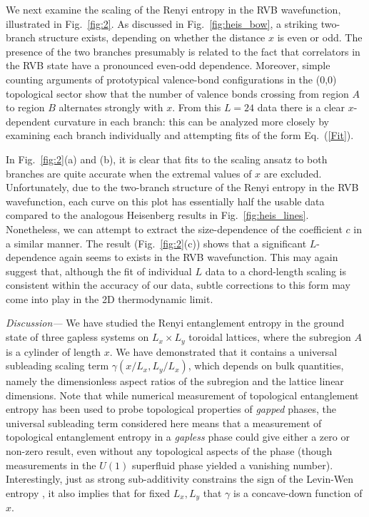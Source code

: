 \documentclass[prl,aps,twocolumn,floatfix,amsmath,amssymb,superscriptaddress,tightenlines]{revtex4}
\begin{document}
We next examine the scaling of the Renyi entropy in the RVB wavefunction, illustrated in Fig.~{\ref{fig:2}}.  
As discussed in Fig.~\ref{fig:heis_bow}, a striking two-branch structure exists, depending on whether the distance $x$ is even or odd.
The presence of the two branches presumably is related to the fact that correlators in the RVB state have a pronounced even-odd dependence. Moreover, simple counting arguments of prototypical valence-bond configurations in the (0,0) topological sector \cite{RVB1,RVB2} show that the number of valence bonds crossing from region $A$ to region $B$ alternates strongly with $x$.  From this $L=24$ data there is a clear $x$-dependent curvature in each branch: this can be analyzed more closely by examining each branch individually and attempting fits of the form Eq.~(\ref{Fit}).  

In Fig.~{\ref{fig:2}}(a) and (b), it is clear that fits to the scaling ansatz to both branches are quite accurate when the extremal values of $x$ are excluded.   Unfortunately, due to the two-branch structure of the Renyi entropy in the RVB wavefunction, each curve on this plot has essentially half the usable data compared to the analogous Heisenberg results in Fig.~\ref{fig:heis_lines}.  Nonetheless, we can attempt to extract the size-dependence of the coefficient $c$ in a similar manner.  The result (Fig.~\ref{fig:2}(c)) shows that a significant $L$-dependence again seems to exists in the RVB wavefunction.  This may again suggest that, although the fit of individual $L$ data to a chord-length scaling is consistent within the accuracy of our data, subtle corrections to this form may come into play in the 2D thermodynamic limit.

{\it Discussion---} We have studied the Renyi entanglement entropy in the ground state of three gapless systems on $L_x\times L_y$ toroidal lattices, where the subregion $A$ is a cylinder of length $x$.  We have  
demonstrated that it contains a universal subleading scaling term $\gamma(x/L_x,L_y/L_x)$, which depends on bulk quantities, namely the dimensionless aspect ratios of the subregion and the lattice linear dimensions.  
Note that while numerical measurement of topological entanglement entropy\cite{LW,KP} has been used to probe topological properties of {\it gapped} phases\cite{isakov}, the universal subleading term considered here means that a measurement of topological entanglement entropy in a {\it gapless} phase could give either a zero or non-zero result, even without any topological aspects of the phase (though measurements in the $U(1)$ superfluid phase yielded a vanishing number\cite{isakov}).
Interestingly, just as strong sub-additivity constrains the sign of the Levin-Wen entropy \cite{LW}, it also implies that for fixed $L_x,L_y$ that $\gamma$ is a concave-down function of $x$.
\end{document}
